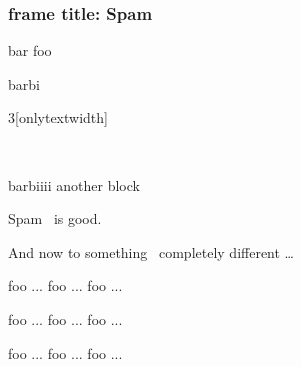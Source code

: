 \documentclass[final]{beamer}
\begin{document}
\begin{frame}[t]
\frametitle{frame title: Spam}

\begin{block}
\maketitle
\end{block}

\begin{block}{bar}
foo

\end{block}


\begin{block}{barbi}
\end{block}

\begin{multicols}{3}[onlytextwidth]

\hrulefill\\

\begin{block}{barbiiii}
another block
\end{block}

Spam~ is good.
\lipsum[0]


And now to something~\cite{guo2017improved} completely different \dots


foo ...
foo ...
foo ...

foo ...
foo ...
foo ...

\lipsum[1]
foo ...
foo ...
foo ...

\lipsum[2]



\end{multicols}
\end{frame}
\end{document}

